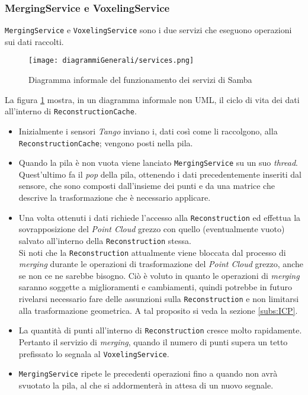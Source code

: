 \subsubsection{MergingService e VoxelingService}
\texttt{MergingService} e \texttt{VoxelingService} sono i due servizi che eseguono operazioni sui dati raccolti.
\begin{figure}[!h] 
    \centering 
    \texttt{[image: diagrammiGenerali/services.png]} 
    \caption{Diagramma informale del funzionamento dei servizi di Samba}
    \label{fig:services}
\end{figure}
La figura \ref{fig:services} mostra, in un diagramma informale non UML, il ciclo di vita dei dati all'interno di \texttt{ReconstructionCache}.
\begin{itemize}
	\item Inizialmente i sensori \emph{Tango} inviano i, dati così come li raccolgono, alla \\\texttt{ReconstructionCache}; vengono posti nella pila.
	\item Quando la pila è non vuota viene lanciato \texttt{MergingService} su un suo \emph{thread}. Quest'ultimo fa il \emph{pop} della pila, ottenendo i dati precedentemente inseriti dal sensore, che sono composti dall'insieme dei punti e da una matrice che descrive la trasformazione che è necessario applicare.
	\item Una volta ottenuti i dati richiede l'accesso alla \texttt{Reconstruction} ed effettua la sovrapposizione del \emph{Point Cloud} grezzo con quello (eventualmente vuoto) salvato all'interno della \texttt{Reconstruction} stessa.\\Si noti che la \texttt{Reconstruction} attualmente viene bloccata dal processo di \emph{merging} durante le operazioni di trasformazione del \emph{Point Cloud} grezzo, anche se non ce ne sarebbe bisogno. Ciò è voluto in quanto le operazioni di \emph{merging} saranno soggette a miglioramenti e cambiamenti, quindi potrebbe in futuro rivelarsi necessario fare delle assunzioni sulla \texttt{Reconstruction} e non limitarsi alla trasformazione geometrica. A tal proposito si veda la sezione \ref{subs:ICP}.
	\item La quantità di punti all'interno di \texttt{Reconstruction} cresce molto rapidamente. Pertanto il servizio di \emph{merging}, quando il numero di punti supera un tetto prefissato lo segnala al \texttt{VoxelingService}.
	\item \texttt{MergingService} ripete le precedenti operazioni fino a quando non avrà svuotato la pila, al che si addormenterà in attesa di un nuovo segnale.

\end{itemize}
